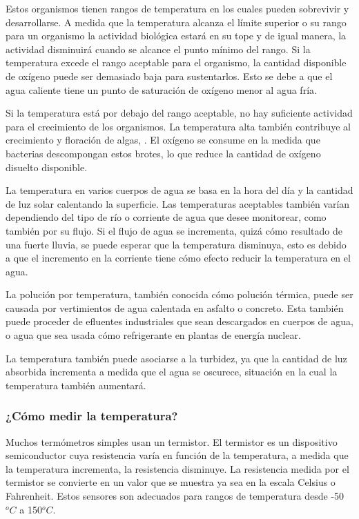 Estos organismos tienen rangos de temperatura en los cuales pueden sobrevivir y desarrollarse. A medida que la temperatura alcanza el l\'imite superior o su rango para un organismo la actividad biol\'ogica estar\'a en su tope y de igual manera, la actividad disminuir\'a cuando se alcance el punto mínimo del rango. 
Si la temperatura excede el rango aceptable para el organismo, la cantidad disponible de ox\'igeno puede ser demasiado baja para sustentarlos. Esto se debe a que el agua caliente tiene un punto de saturaci\'on de ox\'igeno menor al agua fr\'ia. 

Si la temperatura est\'a por debajo del rango aceptable, no hay suficiente actividad para el crecimiento de los organismos. 
La temperatura alta tambi\'en contribuye al crecimiento y floración de algas, \cite{cruzado_campos_aplicacion_2021}.
El oxígeno se consume en la medida que bacterias descompongan estos brotes, lo que reduce la cantidad de oxígeno disuelto disponible.

La temperatura en varios cuerpos de agua se basa en la hora del día y la cantidad de luz solar calentando la superficie.
Las temperaturas aceptables tambi\'en var\'ian dependiendo del tipo de r\'io o corriente de agua que desee monitorear, como también por su flujo. 
Si el flujo de agua se incrementa, quiz\'a c\'omo resultado de una fuerte lluvia, se puede esperar que la temperatura disminuya, esto es debido a que el incremento en la corriente tiene c\'omo efecto reducir la temperatura en el agua.

La poluci\'on por temperatura, tambi\'en conocida c\'omo poluci\'on t\'ermica, puede ser causada por vertimientos de agua calentada en asfalto o concreto. 
Esta tambi\'en puede proceder de efluentes industriales que sean descargados en cuerpos de agua, o agua que sea usada cómo refrigerante en plantas de energ\'ia nuclear. 

La temperatura también puede asociarse a la turbidez, ya que la cantidad de luz absorbida incrementa a medida que el agua se oscurece, situación en la cual la temperatura también aumentar\'a.

\subsubsection{¿Cómo medir la temperatura?}
Muchos termómetros simples usan un termistor.  
El termistor es un dispositivo semiconductor cuya resistencia varía en función de la temperatura, \cite{asale_termistor_nodate} a medida que la temperatura incrementa, la resistencia disminuye.  
La resistencia medida por el termistor se convierte en un valor que se muestra ya sea en la escala Celsius o Fahrenheit.  Estos sensores son adecuados para rangos de temperatura desde -50$^{o}C$ a  150$^{o}C$.

